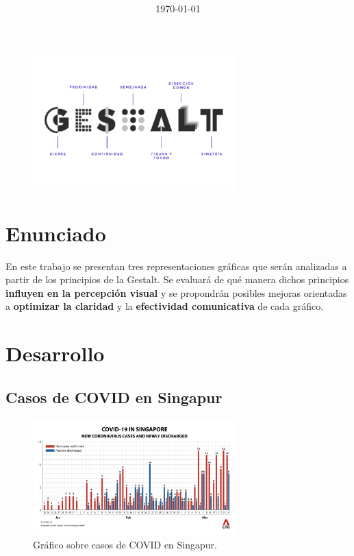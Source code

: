 \documentclass[12pt,a4paper]{article}
\title{\tituloTrabajo \\ \large}
\author{\miNombre}
\date{\today}
\begin{document}
\maketitle             %
\begin{figure}[h]
    \centering
    \includegraphics[width=0.7\textwidth]{gestalt.png}
    \label{fig:portada}
\end{figure}
\tableofcontents       %
\newpage               %

\section{Enunciado}
En este trabajo se presentan tres representaciones gráficas que serán analizadas a partir de los principios de la Gestalt. Se evaluará de qué manera dichos principios \textbf{influyen en la percepción visual} y se propondrán posibles mejoras orientadas a \textbf{optimizar la claridad} y la \textbf{efectividad comunicativa} de cada gráfico.

\section{Desarrollo}
\subsection{Casos de COVID en Singapur}
\begin{figure}[h]
    \centering
    \includegraphics[width=0.7\textwidth]{graf1.png}
    \caption{Gráfico sobre casos de COVID en Singapur.}
    \label{fig:graf1}
\end{figure}
\end{document}
